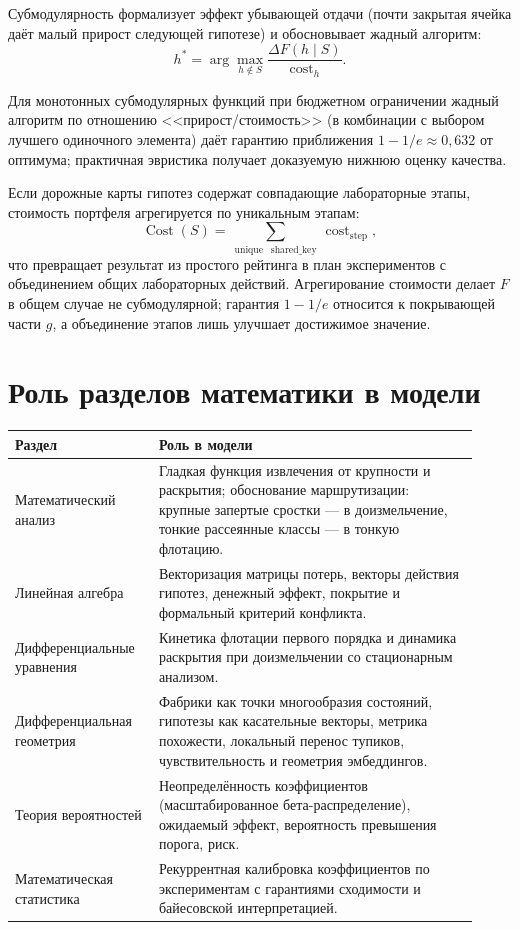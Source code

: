 \documentclass[12pt,a4paper]{article}
\begin{document}
Субмодулярность формализует эффект убывающей отдачи (почти закрытая ячейка
даёт малый прирост следующей гипотезе) и обосновывает жадный алгоритм:
\[
  h^\ast
  =
  \arg\max_{h \notin S}
  \frac{\Delta F(h\mid S)}{\operatorname{cost}_h}.
\]

Для монотонных субмодулярных функций при бюджетном ограничении жадный
алгоритм по отношению <<прирост/стоимость>> (в комбинации с выбором лучшего
одиночного элемента) даёт гарантию приближения
\(1 - 1/e \approx 0{,}632\) от оптимума; практичная эвристика получает
доказуемую нижнюю оценку качества.

Если дорожные карты гипотез содержат совпадающие лабораторные этапы,
стоимость портфеля агрегируется по уникальным этапам:
\[
  \operatorname{Cost}(S)
  =
  \sum_{\operatorname{unique}\ \operatorname{shared\_key}}
  \operatorname{cost}_{\operatorname{step}},
\]
что превращает результат из простого рейтинга в план экспериментов с
объединением общих лабораторных действий. Агрегирование стоимости делает
\(F\) в общем случае не субмодулярной; гарантия \(1-1/e\) относится к
покрывающей части \(g\), а объединение этапов лишь улучшает достижимое
значение.

\section{Роль разделов математики в модели}

\begin{longtable}{p{0.28\linewidth}p{0.64\linewidth}}
\toprule
\textbf{Раздел} & \textbf{Роль в модели}\\
\midrule
\endhead

Математический анализ &
Гладкая функция извлечения от крупности и раскрытия; обоснование
маршрутизации: крупные запертые сростки --- в доизмельчение, тонкие
рассеянные классы --- в тонкую флотацию.\\
\addlinespace

Линейная алгебра &
Векторизация матрицы потерь, векторы действия гипотез, денежный эффект,
покрытие и формальный критерий конфликта.\\
\addlinespace

Дифференциальные уравнения &
Кинетика флотации первого порядка и динамика раскрытия при доизмельчении
со стационарным анализом.\\
\addlinespace

Дифференциальная геометрия &
Фабрики как точки многообразия состояний, гипотезы как касательные векторы,
метрика похожести, локальный перенос тупиков, чувствительность и геометрия
эмбеддингов.\\
\addlinespace

Теория вероятностей &
Неопределённость коэффициентов (масштабированное бета-распределение),
ожидаемый эффект, вероятность превышения порога, риск.\\
\addlinespace

Математическая статистика &
Рекуррентная калибровка коэффициентов по экспериментам с гарантиями
сходимости и байесовской интерпретацией.\\
\bottomrule
\end{longtable}
\end{document}
